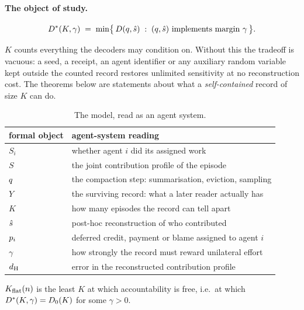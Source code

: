 \paragraph{The object of study.}
\[
  D^\ast(K,\gamma) \;=\; \min\bigl\{\, D(q,\hat{s}) \;:\; (q,\hat{s})
  \text{ implements margin } \gamma \,\bigr\}.
\]

\begin{remark}
\label{rem:counting}
$K$ counts everything the decoders may condition on. Without this the tradeoff
is vacuous: a seed, a receipt, an agent identifier or any auxiliary random
variable kept outside the counted record restores unlimited sensitivity at no
reconstruction cost. The theorems below are statements about what a
\emph{self-contained} record of size $K$ can do.
\end{remark}

\begin{table}[t]
\centering
\caption{The model, read as an agent system.}
\label{tab:mapping}
\small
\begin{tabular}{@{}ll@{}}
\toprule
formal object & agent-system reading \\
\midrule
$S_i$        & whether agent $i$ did its assigned work \\
$S$          & the joint contribution profile of the episode \\
$q$       & the compaction step: summarisation, eviction, sampling \\
$Y$          & the surviving record: what a later reader actually has \\
$K$          & how many episodes the record can tell apart \\
$\hat{s}$       & post-hoc reconstruction of who contributed \\
$p_i$     & deferred credit, payment or blame assigned to agent $i$ \\
$\gamma$     & how strongly the record must reward unilateral effort \\
$d_{\mathrm{H}}$        & error in the reconstructed contribution profile \\
\bottomrule
\end{tabular}
\end{table}

\begin{definition}
\label{def:kflat}
$K_{\mathrm{flat}}(n)$ is the least $K$ at which accountability is free, i.e.\ at which
$D^\ast(K,\gamma) = D_0(K)$ for some $\gamma > 0$.
\end{definition}
